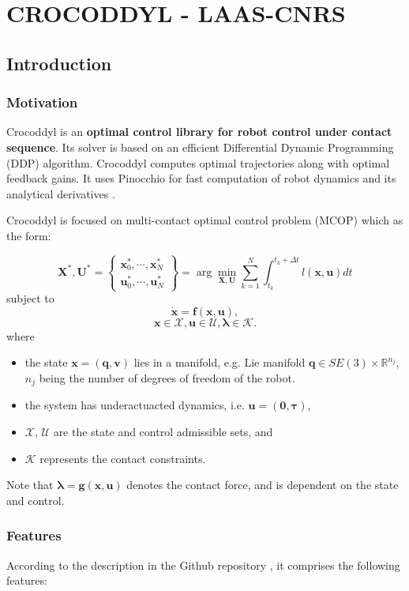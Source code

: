 \chapter{CROCODDYL - LAAS-CNRS}\label{chapter1}
\section{Introduction}
\subsection{Motivation}
Crocoddyl is an \textbf{optimal control library for robot control under contact sequence}. Its solver is based on an efficient Differential Dynamic Programming (DDP) algorithm. Crocoddyl computes optimal trajectories along with optimal feedback gains. It uses Pinocchio for fast computation of robot dynamics and its analytical derivatives \cite{crocoddylweb}. 

Crocoddyl is focused on multi-contact optimal control problem (MCOP) which as the form:

$$\mathbf{X}^*,\mathbf{U}^*=
\begin{Bmatrix} \mathbf{x}^*_0,\cdots,\mathbf{x}^*_N \\
				  \mathbf{u}^*_0,\cdots,\mathbf{u}^*_N
\end{Bmatrix} =
\arg\min_{\mathbf{X},\mathbf{U}} \sum_{k=1}^N \int_{t_k}^{t_k+\Delta t} l(\mathbf{x},\mathbf{u})dt$$
subject to
$$ \mathbf{\dot{x}} = \mathbf{f}(\mathbf{x},\mathbf{u}),$$
$$ \mathbf{x}\in\mathcal{X}, \mathbf{u}\in\mathcal{U}, \boldsymbol{\lambda}\in\mathcal{K}.$$
where
\begin{itemize}
\item the state $\mathbf{x}=(\mathbf{q},\mathbf{v})$ lies in a manifold, e.g. Lie manifold $\mathbf{q}\in SE(3)\times \mathbb{R}^{n_j}$, $n_j$ being the number of degrees of freedom of the robot.
\item the system has underactuacted dynamics, i.e. $\mathbf{u}=(\mathbf{0},\boldsymbol{\tau})$,
\item $\mathcal{X}$, $\mathcal{U}$ are the state and control admissible sets, and
\item $\mathcal{K}$ represents the contact constraints.
\end{itemize}

Note that $\boldsymbol{\lambda}=\mathbf{g}(\mathbf{x},\mathbf{u})$ denotes the contact force, and is dependent on the state and control.

\subsection{Features}
According to the description in the Github repository \cite{crocoddylweb}, it comprises the following features:

